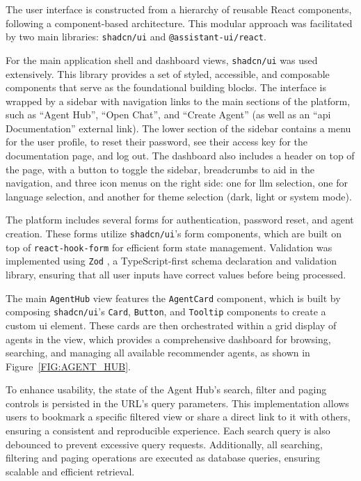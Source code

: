 The user interface is constructed from a hierarchy of reusable React components, following a component-based architecture. This modular approach was facilitated by two main libraries: \texttt{shadcn/ui} and \texttt{@assistant-ui/react}.

For the main application shell and dashboard views, \texttt{shadcn/ui} was used extensively. This library provides a set of styled, accessible, and composable components that serve as the foundational building blocks. The interface is wrapped by a sidebar with navigation links to the main sections of the platform, such as ``Agent Hub'', ``Open Chat'', and ``Create Agent'' (as well as an ``\acs{api} Documentation'' external link). The lower section of the sidebar contains a menu for the user profile, to reset their password, see their access key for the documentation page, and log out. The dashboard also includes a header on top of the page, with a button to toggle the sidebar, breadcrumbs to aid in the navigation, and three icon menus on the right side: one for \acs{llm} selection, one for language selection, and another for theme selection (dark, light or system mode).

The platform includes several forms for authentication, password reset, and agent creation. These forms utilize \texttt{shadcn/ui}'s form components, which are built on top of \texttt{react-hook-form} for efficient form state management. Validation was implemented using \texttt{Zod} \cite{ZOD}, a TypeScript-first schema declaration and validation library, ensuring that all user inputs have correct values before being processed.

The main \texttt{AgentHub} view features the \texttt{AgentCard} component, which is built by composing \texttt{shadcn/ui}'s \texttt{Card}, \texttt{Button}, and \texttt{Tooltip} components to create a custom \acs{ui} element. These cards are then orchestrated within a grid display of agents in the view, which provides a comprehensive dashboard for browsing, searching, and managing all available recommender agents, as shown in Figure~\ref{FIG:AGENT_HUB}.

To enhance usability, the state of the Agent Hub's search, filter and paging controls is persisted in the URL's query parameters. This implementation allows users to bookmark a specific filtered view or share a direct link to it with others, ensuring a consistent and reproducible experience. Each search query is also debounced to prevent excessive query requests. Additionally, all searching, filtering and paging operations are executed as database queries, ensuring scalable and efficient retrieval.

